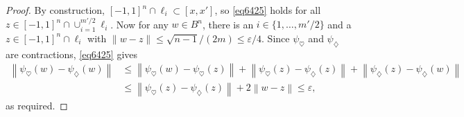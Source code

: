 \documentclass[10pt,a4paper]{amsart}
\newcommand{\di}{\diamondsuit}
\newcommand{\ee}{\varepsilon}
\begin{document}
\begin{proof}
By construction, $[-1,1]^n\cap \ell_i\subset [x, x']$, so \eqref{eq6425} holds for all $z\in [-1,1]^n\cap \cup_{i=1}^{m'/2}\ell_i$. Now for any $w\in B^n$, there is an $i\in\{1,\dots,m'/2\}$ and a $z\in [-1,1]^n\cap\ell_i$ with $\|w-z\|\le \sqrt{n-1}/(2m)\le \ee/4$.  Since $\psi_{\heartsuit}$ and $\psi_\di$ are contractions, \eqref{eq6425} gives
\begin{align*}
\left\|	\psi_{\heartsuit}(w)-\psi_\di (w)\right\|
&\le \left\|\psi_{\heartsuit}(w)-\psi_{\heartsuit} (z)\right\|
+\left\|\psi_{\heartsuit} (z)-\psi_{\di}(z)\right\|+
\left\|\psi_{\di}(z)-\psi_\di (w)\right\|\\
&\le \left\|\psi_{\heartsuit}(z)-\psi_\di (z)\right\|
+2\left\|w-z\right\|\le \ee,
\end{align*}
as required.
\end{proof}
\end{document}
